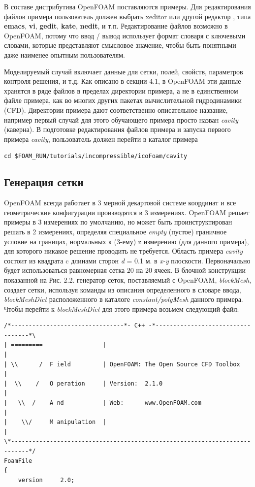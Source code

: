 В составе дистрибутива OpenFOAM поставляются примеры. Для редактирования файлов примера пользователь должен выбрать
 xeditor или другой редактор , типа \textbf{emacs}, \textbf{vi}, \textbf{gedit}, \textbf{kate}, \textbf{nedit},
 и т.п. Редактирование файлов возможно в OpenFOAM, потому что ввод / вывод использует формат словаря с ключевыми
 словами, которые представляют смысловое значение, чтобы быть понятными даже наименее опытным пользователям.

Моделируемый случай включает данные для сетки, полей, свойств, параметров контроля решения, и т.д.
 Как описано в секции 4.1, в OpenFOAM эти данные хранятся в ряде файлов в пределах директории примера,
 а не в единственном файле примера, как во многих других пакетах вычислительной гидродинамики (CFD).
 Директории примера дают соответственно описательное название, например первый случай для этого
 обучающего примера просто назван \textsl{cavity} (каверна). В подготовке редактирования файлов примера и
 запуска первого примера \textsl{cavity}, пользователь должен перейти в каталог примера

\texttt{cd \$FOAM\_RUN/tutorials/incompressible/icoFoam/cavity}

\subsection{Генерация сетки}
\label{sec:2.1.1.1}

OpenFOAM всегда работает в 3 мерной декартовой системе координат и все геометрические конфигурации производятся
 в 3 измерениях. OpenFOAM решает примеры в 3 измерениях по умолчанию, но может быть проинструктирован решать
 в 2 измерениях, определяя специальное \textsl{empty} (пустое) граничное условие на границах, нормальных к (3-ему)
 z измерению (для данного примера), для которого никакое решение проводить не требуется.
Область примера \textsl{cavity} состоит из квадрата c длинами сторон \textit{d} = 0.1 м. в \textit{x-y} плоскости.
Первоначально будет использоваться равномерная сетка 20 на 20 ячеек. В блочной конструкции показанной на Рис. 2.2. генератор сеток,
 поставляемый с OpenFOAM, \textit{blockMesh}, создает сетки, используя команды из описания определенного в словаре ввода,
 \textit{blockMeshDict} расположенного в каталоге \textit{constant/polyMesh} данного примера. Чтобы перейти к
 \textit{blockMeshDict}  для этого примера  возьмем следующий файл:
\begin{verbatim}
/*--------------------------------*- C++ -*----------------------------------*\
| =========                 |                                                 |
| \\      /  F ield         | OpenFOAM: The Open Source CFD Toolbox           |
|  \\    /   O peration     | Version:  2.1.0                                 |
|   \\  /    A nd           | Web:      www.OpenFOAM.com                      |
|    \\/     M anipulation  |                                                 |
\*---------------------------------------------------------------------------*/
FoamFile
{
    version     2.0;
\end{verbatim} 

